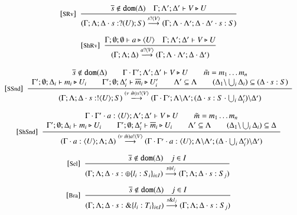 \begin{figure}[h!]
	\[
	\begin{array}{c}
		{\footnotesize [\textrm{SRv}]}~~\displaystyle \frac { 
			\overline{s} \notin \mathtt{dom}(\Delta) \quad \Gamma; \Lambda'; \Delta' \vdash V \triangleright U
		 }{ 
			(\Gamma; \Lambda; \Delta \cdot s: ? (U) ; S) \stackrel{s ? \langle V \rangle}{\longrightarrow} (\Gamma; \Lambda\cdot\Lambda'; \Delta\cdot\Delta' \cdot s: S)
		 } 
		\\[8mm]

		{\footnotesize [\textrm{ShRv}]}~~\displaystyle \frac { 
			\Gamma; \emptyset; \emptyset \vdash a \triangleright \langle U \rangle
			\quad
			\Gamma; \Lambda'; \Delta' \vdash V \triangleright U
		 }{ 
			(\Gamma; \Lambda; \Delta) \stackrel{a ? \langle V \rangle}{\longrightarrow} (\Gamma; \Lambda\cdot\Lambda'; \Delta\cdot\Delta')
		 } 
		\\[8mm]

		{\footnotesize [\textrm{SSnd}]}~~\displaystyle \frac { 
			\begin{array}{c}
				\overline{s} \notin \mathtt{dom}(\Delta)
				\qquad 
				\Gamma \cdot \Gamma'; \Lambda'; \Delta' \vdash V \triangleright U
				\qquad
				\tilde{m} = m_1 \dots m_n
				\\
				\Gamma'; \emptyset; \Delta_i \vdash m_i \triangleright U_i
				\qquad
				\Gamma'; \emptyset; \Delta_i' \vdash \overline{m}_i \triangleright U'_i
				\qquad
				\Lambda' \subseteq \Lambda
				\qquad
				(\Delta_1 \backslash \bigcup_{i}\Delta_i) \subseteq (\Delta \cdot s: S)
			\end{array}
		 }{ 
			(\Gamma; \Lambda; \Delta \cdot s: ! \langle U \rangle ; S) \stackrel{(\nu\ \tilde{m}) s ! \langle V \rangle}{\longrightarrow} (\Gamma \cdot \Gamma'; \Lambda\backslash\Lambda';
			(\Delta \cdot s: S \cdot \bigcup_{i} \Delta'_i) \backslash \Delta')
		 } 
		\\[8mm]

		{\footnotesize [\textrm{ShSnd}]}~~\displaystyle \frac { 
			\begin{array}{c}
				\Gamma \cdot \Gamma' \cdot a: \langle U \rangle; \Lambda'; \Delta' \vdash V \triangleright U
				\qquad
				\tilde{m} = m_1 \dots m_n
				\\
				\Gamma'; \emptyset; \Delta_i \vdash m_i \triangleright U_i
				\qquad
				\Gamma'; \emptyset; \Delta'_i \vdash \overline{m}_i \triangleright U_i
				\qquad
				\Lambda' \subseteq \Lambda
				\qquad
				(\Delta_1 \backslash \bigcup_{i}\Delta_i) \subseteq \Delta
			\end{array}
		 }{ 
			(\Gamma \cdot a: \langle U \rangle ; \Lambda; \Delta) \stackrel{(\nu\ \tilde{m}) a ! \langle V \rangle}{\longrightarrow} (\Gamma \cdot \Gamma' \cdot a: \langle U \rangle; \Lambda\backslash\Lambda';
			(\Delta \cdot \bigcup_{i}\Delta'_i) \backslash \Delta')
		 } 
		\\[8mm]
		{\footnotesize [\textrm{Sel}]}~~\displaystyle \frac { 
			\overline{s} \notin \mathtt{dom}(\Delta) \quad j \in I
		 }{ 
			(\Gamma; \Lambda; \Delta \cdot s: \oplus \{l_i: S_i\}_{i \in I}) \stackrel{s \oplus l_j}{\longrightarrow} (\Gamma; \Lambda; \Delta \cdot s:S_j)
		 } 
		\\[8mm]
		{\footnotesize [\textrm{Bra}]}~~\displaystyle \frac { 
			\overline{s} \notin \mathtt{dom}(\Delta) \quad j \in I
		 }{ 
			(\Gamma; \Lambda; \Delta \cdot s: \& \{l_i: T_i\}_{i \in I}) \stackrel{s \& l_j}{\longrightarrow} (\Gamma; \Lambda; \Delta \cdot s:S_j)
		 } 
		\\[8mm]


\end{array}\]
\end{figure}
